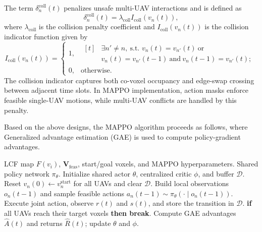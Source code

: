 \documentclass[10pt,journal,letterpaper]{IEEEtran}
\begin{document}
The term $\delta_n^{\mathrm{coll}}(t)$ penalizes unsafe multi-UAV interactions and is defined as
\begin{equation}
\delta_n^{\mathrm{coll}}(t)=\lambda_{\mathrm{coll}}I_{\mathrm{coll}}(v_n(t)),
\end{equation}
where $\lambda_{\mathrm{coll}}$ is the collision penalty coefficient and $I_{\mathrm{coll}}(v_n(t))$ is the collision indicator function given by
\begin{equation}
I_{\mathrm{coll}}(v_n(t))=
\begin{cases}
1, &\begin{aligned}[t]
&\exists n'\neq n,\ \text{s.t. }v_n(t)=v_{n'}(t)\ \text{or}\\
&v_n(t)=v_{n'}(t-1)\ \text{and}\ v_n(t-1)=v_{n'}(t);
\end{aligned}\\
0, & \mathrm{otherwise}.
\end{cases}
\end{equation}
The collision indicator captures both co-voxel occupancy and edge-swap crossing between adjacent time slots. In MAPPO implementation, action masks enforce feasible single-UAV motions, while multi-UAV conflicts are handled by this penalty.

Based on the above designs, the MAPPO algorithm proceeds as follows, where Generalized advantage estimation (GAE) is used to compute policy-gradient advantages.

\begin{algorithm}[!t]
\caption{LCF-Aided Multi-UAV Trajectory Planning via MAPPO}
\label{alg:lcf_mappo}
\begin{algorithmic}
\footnotesize
\REQUIRE LCF map $F(v_i)$, $\mathbf{V}_{\mathrm{feas}}$, start/goal voxels, and MAPPO hyperparameters.
\ENSURE Shared policy network $\pi_{\theta}$.
\STATE Initialize shared actor $\theta$, centralized critic $\phi$, and buffer $\mathcal{D}$.
\REPEAT
    \STATE Reset $v_n(0)\leftarrow v_n^{\mathrm{start}}$ for all UAVs and clear $\mathcal{D}$.
        \STATE Build local observations $o_n(t-1)$ and sample feasible actions $a_n(t-1)\sim\pi_{\theta}(\cdot\mid o_n(t-1))$.
        \STATE Execute joint action, observe $r(t)$ and $s(t)$, and store the transition in $\mathcal{D}$.
        \STATE \textbf{if} all UAVs reach their target voxels \textbf{then break}.
    \ENDFOR
    \STATE Compute GAE advantages $\hat{A}(t)$ and returns $\hat{R}(t)$; update $\theta$ and $\phi$.
\end{algorithmic}
\end{algorithm}
\end{document}
